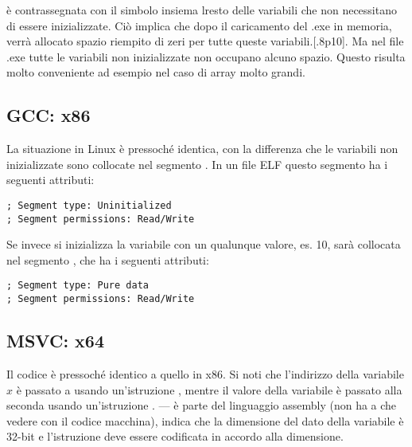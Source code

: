  è contrassegnata con il simbolo  insiema lresto delle variabili che non necessitano di essere inizializzate.
Ciò implica che dopo il caricamento del .exe in memoria, verrà allocato spazio riempito di zeri per tutte queste variabili.[.8p10].
Ma nel file .exe tutte le variabili non inizializzate non occupano alcuno spazio.
Questo risulta molto conveniente ad esempio nel caso di array molto grandi.



\subsection{GCC: x86}

La situazione in Linux è pressoché identica, con la differenza che le variabili non inizializzate sono collocate nel segmento . 
In un file \ac{ELF} questo segmento ha i seguenti attributi:

\begin{lstlisting}
; Segment type: Uninitialized
; Segment permissions: Read/Write
\end{lstlisting}

Se invece si inizializza la variabile con un qualunque valore, es. 10, 
sarà collocata nel segmento , che ha i seguenti attributi:

\begin{lstlisting}
; Segment type: Pure data
; Segment permissions: Read/Write
\end{lstlisting}

\subsection{MSVC: x64}



Il codice è pressoché identico a quello in x86.
Si noti che l'indirizzo della variabile $x$ è passato a  usando un'istruzione \LEA ,
mentre il valore della variabile è passato alla seconda \printf usando un'istruzione \MOV.
--- è parte del linguaggio assembly (non ha a che vedere con il codice macchina),
indica che la dimensione del dato della variabile è 32-bit e l'istruzione \MOV deve essere codificata in accordo alla dimensione.

